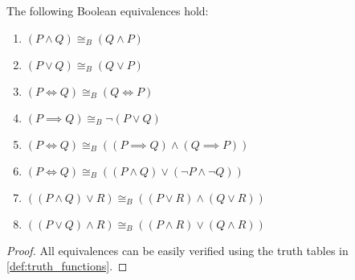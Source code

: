 \begin{proposition}\label{thm:boolean_equivalences}
  The following Boolean equivalences hold:
  \begin{enumerate}
    \item \( (P \land Q) \cong_B (Q \land P) \)
    \item \( (P \lor Q) \cong_B (Q \lor P) \)
    \item \( (P \iff Q) \cong_B (Q \iff P) \)
    \item \( (P \implies Q) \cong_B \neg (P \lor Q) \)
    \item \( (P \iff Q) \cong_B ((P \implies Q) \land (Q \implies P)) \)
    \item \( (P \iff Q) \cong_B ((P \land Q) \lor (\neg P \land \neg Q)) \)
    \item \( ((P \land Q) \lor R) \cong_B ((P \lor R) \land (Q \lor R)) \)
    \item \( ((P \lor Q) \land R) \cong_B ((P \land R) \lor (Q \land R)) \)
  \end{enumerate}
\end{proposition}
\begin{proof}
  All equivalences can be easily verified using the truth tables in \cref{def:truth_functions}.
\end{proof}
